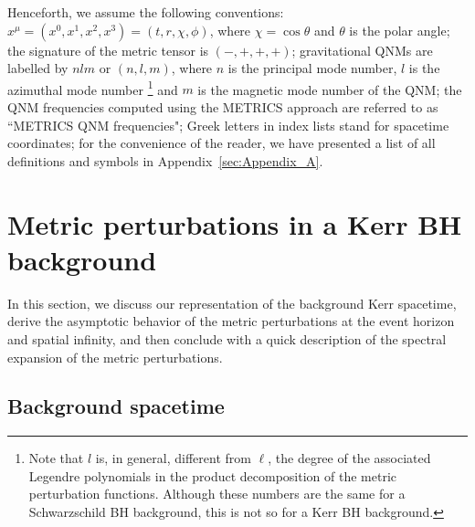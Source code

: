 \documentclass[aps,prx,amsmath,floats,floatfix,twocolumn,
  superscriptaddress,nofootinbib,showpacs]{revtex4-1}
\begin{document}
Henceforth, we assume the following conventions: 
$x^{\mu} = (x^0, x^1, x^2, x^3) = (t, r, \chi, \phi)$, where $\chi = \cos \theta$ and $\theta$ is the polar angle;
the signature of the metric tensor is $(-, +, +, +)$;
gravitational QNMs are labelled by $n l m$ or $(n, l, m)$, where $n$ is the principal mode number, $l$ is the azimuthal mode number \footnote{Note that $l$ is, in general, different from $\ell$, the degree of the associated Legendre polynomials in the product decomposition of the metric perturbation functions. Although these numbers are the same for a Schwarzschild BH background, this is not so for a Kerr BH background.} and $m$ is the magnetic mode number of the QNM;
the QNM frequencies computed using the METRICS approach are referred to as ``METRICS QNM frequencies"; 
Greek letters in index lists stand for spacetime coordinates;
for the convenience of the reader, we have presented a list of all definitions and symbols in Appendix~\ref{sec:Appendix_A}.

\section{Metric perturbations in a Kerr BH background}
\label{sec:EFEs}

In this section, we discuss our representation of the background Kerr spacetime, derive the asymptotic behavior of the metric perturbations at the event horizon and spatial infinity, and then conclude with a quick description of the spectral expansion of the metric perturbations.

\subsection{Background spacetime}
\label{sec:metpert}
\end{document}

